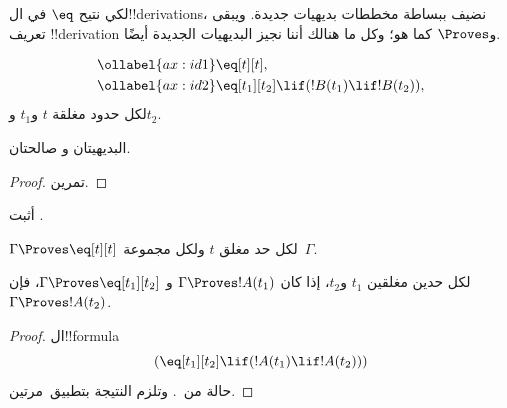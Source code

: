 \documentclass[../../../include/open-logic-section]{subfiles}
\begin{document}


لكي نتيح $\eq$ في ال!!{derivation}s، نضيف ببساطة مخططات بديهيات جديدة.
ويبقى تعريف !!{derivation} و$\Proves$ كما هو؛ وكل ما هنالك أننا نجيز
البديهيات الجديدة أيضًا.

\begin{defn}
\begin{align}
\ollabel{ax:id1} & \eq[t][t], \\
\ollabel{ax:id2} & \eq[t_1][t_2] \lif (!B(t_1) \lif
  !B(t_2)),
\end{align}
لكل حدود مغلقة $t$ و$t_1$ و$t_2$.
\end{defn}

\begin{prop}
  البديهيتان  و صالحتان.
\end{prop}

\begin{proof}
  تمرين.
\end{proof}

\begin{prob}
أثبت .
\end{prob}

\begin{prop}
 $\Gamma \Proves \eq[t][t]$ لكل حد مغلق $t$ ولكل مجموعة~$\Gamma$.
\end{prop}

\begin{prop}
  لكل حدين مغلقين $t_1$ و$t_2$، إذا كان $\Gamma \Proves !A(t_1)$ و
  $\Gamma \Proves \eq[t_1][t_2]$، فإن $\Gamma \Proves !A(t_2)$.
\end{prop}

\begin{proof}
ال!!{formula}
\[
(\eq[t_1][t_2] \lif (!A(t_1) \lif !A(t_2)))
\]
حالة من~. وتلزم النتيجة بتطبيق~\MP مرتين.
\end{proof}
\end{document}
